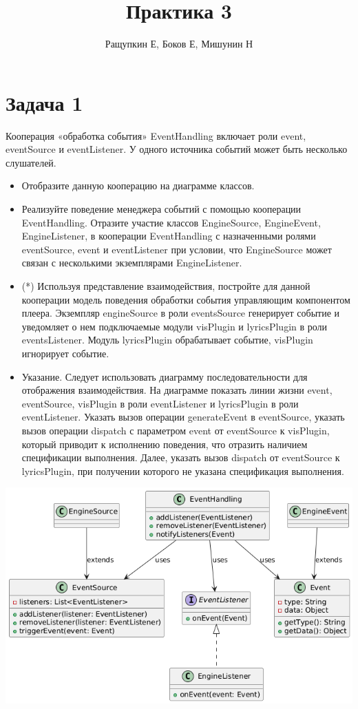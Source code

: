 \documentclass{article}
\begin{document}
\title{Практика 3}
\author{Ращупкин Е, Боков Е, Мишунин Н}
\maketitle

\section{Задача 1}
Кооперация «обработка события» EventHandling включает роли event, eventSource и eventListener. У одного источника событий может быть несколько слушателей.

\begin{itemize}
    \item Отобразите данную кооперацию на диаграмме классов.
    \item Реализуйте поведение менеджера событий с помощью кооперации EventHandling. Отразите участие классов EngineSource, EngineEvent, EngineListener, в кооперации EventHandling с назначенными ролями eventSource, event и eventListener при условии, что EngineSource может связан с несколькими экземплярами EngineListener.
    \item (*) Используя представление взаимодействия, постройте для данной кооперации модель поведения обработки события управляющим компонентом плеера. Экземпляр engineSource в роли eventsSource генерирует событие и уведомляет о нем подключаемые модули visPlugin и lyricsPlugin в роли eventsListener. Модуль lyricsPlugin обрабатывает событие, visPlugin игнорирует событие.
    \item Указание. Следует использовать диаграмму последовательности для отображения взаимодействия. На диаграмме показать линии жизни event, eventSource, visPlugin в роли eventListener и lyricsPlugin в роли eventListener. Указать вызов операции generateEvent в eventSource, указать вызов операции dispatch с параметром event от eventSource к visPlugin, который приводит к исполнению поведения, что отразить наличием спецификации выполнения. Далее, указать вызов dispatch от eventSource к lyricsPlugin, при получении которого не указана спецификация выполнения.
\end{itemize}

\includegraphics[width=\textwidth]{1_1.png}
\end{document}
